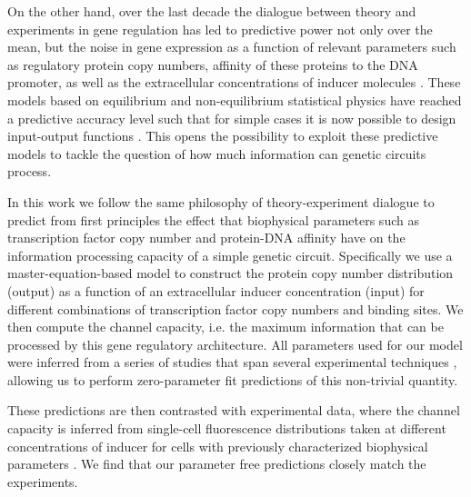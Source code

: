 On the other hand, over the last decade the dialogue between theory and
experiments in gene regulation has led to predictive power not only over the
mean, but the noise in gene expression as a function of relevant parameters such
as regulatory protein copy numbers, affinity of these proteins to the DNA
promoter, as well as the extracellular concentrations of inducer
molecules \cite{Garcia2011c, Jones2014a, Brewster2014, Razo-Mejia2018} . These models based on equilibrium and
non-equilibrium statistical physics have reached a predictive accuracy level
such that for simple cases it is now possible to design input-output functions
\cite{Brewster2012, Barnes2018}. This opens the possibility to exploit these
predictive models to tackle the question of how much information can genetic
circuits process.

In this work we follow the same philosophy of theory-experiment dialogue to
predict from first principles the effect that biophysical parameters such as
transcription factor copy number and protein-DNA affinity have on the
information processing capacity of a simple genetic circuit. Specifically we use
a master-equation-based model to construct the protein copy number distribution
(output) as a function of an extracellular inducer concentration (input) for
different combinations of transcription factor copy numbers and binding sites.
We then compute the channel capacity, i.e. the maximum information that can be
processed by this gene regulatory architecture. All parameters used for our
model were inferred from a series of studies that span several experimental
techniques \cite{Garcia2011c, Brewster2012, Jones2014a, Brewster2014,
Razo-Mejia2018} , allowing us to
perform zero-parameter fit predictions of this non-trivial quantity.

These predictions are then contrasted with experimental data, where the channel
capacity is inferred from single-cell fluorescence distributions taken at
different concentrations of inducer for cells with previously characterized
biophysical parameters \cite{Garcia2011c, Razo-Mejia2018}. We find that our
parameter free predictions closely match the experiments.


